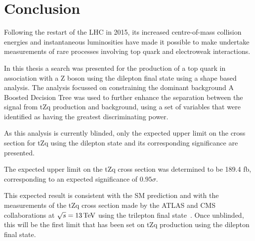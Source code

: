 \chapter{Conclusion}\label{chapter:conclusion}
Following the restart of the LHC in 2015, its increased centre-of-mass collision energies and instantaneous luminosities have made it possible to make undertake measurements of rare processes involving top quark and electroweak interactions.

In this thesis a search was presented for the production of a top quark in association with a Z boson using the dilepton final state using a shape based analysis.
The analysis focussed on constraining the dominant background 
A Boosted Decision Tree was used to further enhance the separation between the signal from tZq production and background, using a set of variables that were identified as having the greatest discriminating power.

As this analysis is currently blinded, only the expected upper limit on the cross section for tZq using the dilepton state and its corresponding significance are presented.

The expected upper limit on the tZq cross section was determined to be 189.4 fb, corresponding to an expected significance of $0.95 \sigma$.

This expected result is consistent with the SM prediction and with the measurements of the tZq cross section made by the ATLAS and CMS collaborations at $\sqrt{s} = 13 \,\text{Te\hspace{-.08em}V}$ using the trilepton final state~\cite{Aaboud:2017ylb,Sirunyan:2017nbr}.  
Once unblinded, this will be the first limit that has been set on tZq production using the dilepton final state.

%
%

